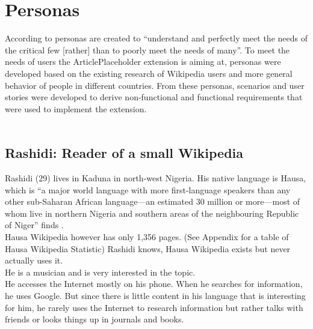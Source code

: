 \chapter{Personas}

According to \citet[182]{design:01} personas are created to ``understand and perfectly meet the needs of the critical few [rather] than to poorly meet the needs of many''. To meet the needs of users the ArticlePlaceholder extension is aiming at, personas were developed based on the existing research of Wikipedia users and more general behavior of people in different countries.  From these personas, scenarios and user stories were developed to derive non-functional and functional requirements that were used to implement the extension. \\
\\
\section{Rashidi: Reader of a small Wikipedia}
Rashidi (29) lives in Kaduna in north-west Nigeria. His native language is Hausa, which is ``a major world language with more first-language speakers than any other sub-Saharan African language---an estimated 30 million or more---most of whom live in northern Nigeria and southern areas of the neighbouring Republic of Niger'' finds \citet[1]{hausa}. \\
Hausa Wikipedia however has only 1,356 pages. (See Appendix for a table of Hausa Wikipedia Statistic) Rashidi knows, Hausa Wikipedia exists but never actually uses it. \\
He is a musician and is very interested in the topic. \\
He accesses the Internet mostly on his phone. When he searches for information, he uses Google. But since there is little content in his language that is interesting for him, he rarely uses the Internet to research information but rather talks with friends or looks things up in journals and books.


